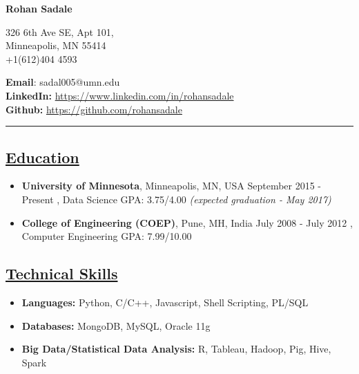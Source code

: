 \documentclass[10pt]{article}
\begin{document}

\hspace{130pt} {\bfseries {\huge Rohan Sadale}}
\vspace{10pt}

\noindent \begin{minipage}[b]{0.3\hsize}
326 6th Ave SE, Apt 101,  \\
Minneapolis, MN 55414 \\
+1(612)404 4593
\end{minipage}
\hfill
\begin{minipage}[b]{0.52\hsize}
{\bfseries {\normalsize Email}}: {\normalsize sadal005@umn.edu} \\
{\bfseries {\normalsize LinkedIn:}} \normalsize \url{https://www.linkedin.com/in/rohansadale} \\
{\bfseries Github:} \normalsize \url{https://github.com/rohansadale}
\end{minipage}



\vspace{4pt}

\hrule
\vspace{-0.2cm}
\subsection*{\underline{Education}}
\vspace{-0.1cm}
\begin{itemize}[leftmargin=*]
\item[] {\bfseries University of Minnesota}, Minneapolis, MN, USA \hfill September 2015 - Present
, Data Science \hspace{0.2in} GPA: 3.75/4.00  \hfill {\sl (expected graduation - May 2017)}
\vspace{-0.1cm}
\item[] {\bfseries College of Engineering (COEP)}, Pune, MH, India \hfill July 2008 - July 2012  
, Computer Engineering	 \hspace{0.2in} GPA: 7.99/10.00
\end{itemize}

\subsection*{\underline{Technical Skills}}
\vspace{-0.1cm}
\begin{itemize}[leftmargin=*]
 \item[]  \textbf{Languages:}  Python, C/C++, Javascript, Shell Scripting, PL/SQL
 \vspace{-0.25cm}
 \item[]   \textbf{Databases:}  MongoDB, MySQL, Oracle 11g
  \vspace{-0.25cm}
 \item[]   \textbf{Big Data/Statistical Data Analysis:}   R, Tableau, Hadoop, Pig, Hive, Spark
\end{itemize}
\end{document}
